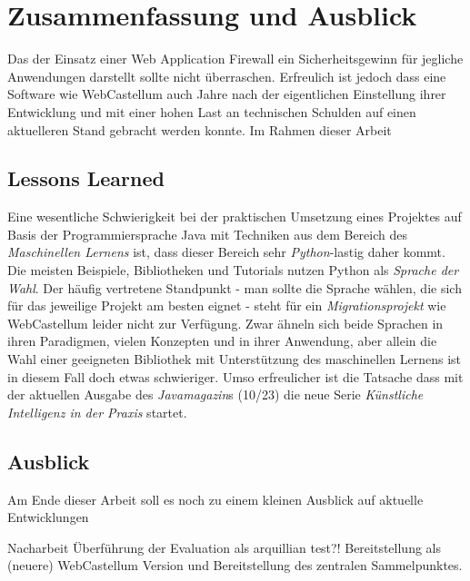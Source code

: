 \chapter{Zusammenfassung und Ausblick}



Das der Einsatz einer Web Application Firewall ein Sicherheitsgewinn für jegliche Anwendungen darstellt sollte nicht überraschen. Erfreulich ist jedoch dass eine Software wie WebCastellum auch Jahre nach der eigentlichen Einstellung ihrer Entwicklung und mit einer hohen Last an technischen Schulden auf einen aktuelleren Stand gebracht werden konnte. Im Rahmen dieser Arbeit 

\section{Lessons Learned}
Eine wesentliche Schwierigkeit bei der praktischen Umsetzung eines Projektes auf Basis der Programmiersprache Java mit Techniken aus dem Bereich des \emph{Maschinellen Lernens} ist, dass dieser Bereich sehr \glqq\emph{Python}\grqq-lastig daher kommt. Die meisten Beispiele, Bibliotheken und Tutorials nutzen Python als \emph{Sprache der Wahl}. Der häufig vertretene Standpunkt - man sollte die Sprache wählen, die sich für das jeweilige Projekt am besten eignet - steht für ein \emph{Migrationsprojekt} wie WebCastellum leider nicht zur Verfügung. Zwar ähneln sich beide Sprachen in ihren Paradigmen, vielen Konzepten und in ihrer Anwendung, aber allein die Wahl einer geeigneten Bibliothek mit Unterstützung des maschinellen Lernens ist in diesem Fall doch etwas schwieriger. Umso erfreulicher ist die Tatsache dass mit der aktuellen Ausgabe des \emph{Javamagazin}s (10/23) die neue Serie \glqq\emph{Künstliche Intelligenz in der Praxis}\grqq{} startet.\\ 


\section{Ausblick}

Am Ende dieser Arbeit soll es noch zu einem kleinen Ausblick auf aktuelle Entwicklungen


\begin{neu}
  Nacharbeit Überführung der Evaluation als arquillian test?!
  Bereitstellung als (neuere) WebCastellum Version und Bereitstellung des zentralen Sammelpunktes.
\end{neu}

